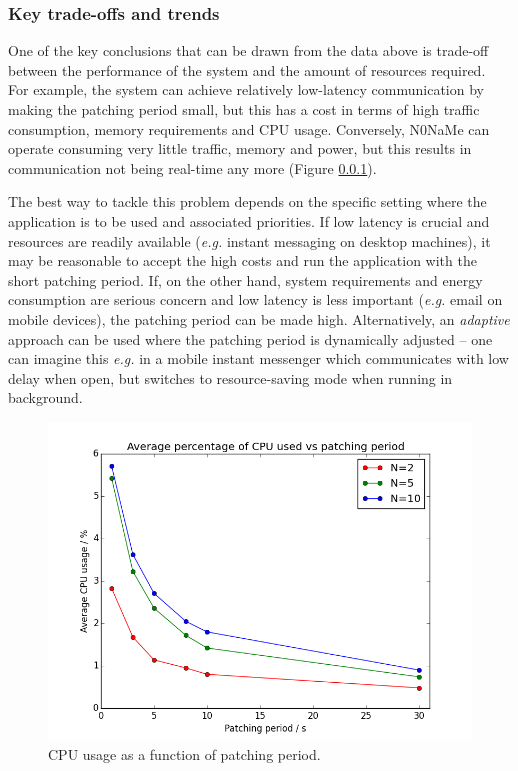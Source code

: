 \documentclass[a4paper, 12pt]{report}
\newcommand{\funkytt}{\fontfamily{AnonymousPro}\selectfont}
\begin{document}
\subsubsection{Key trade-offs and trends}
One of the key conclusions that can be drawn from the data above is trade-off between the performance of the system and the amount of resources required. \\

For example, the system can achieve relatively low-latency communication by making the patching period small, but this has a cost in terms of high traffic consumption, memory requirements and CPU usage. Conversely, {\funkytt N0NaMe} can operate consuming very little traffic, memory and power, but this results in communication not being real-time any more (Figure \ref{}). 


The best way to tackle this problem depends on the specific setting where the application is to be used and associated priorities. If low latency is crucial and resources are readily available (\textit{e.g.} instant messaging on desktop machines), it may be reasonable to accept the high costs and run the application with the short patching period. If, on the other hand, system requirements and energy consumption are serious concern and low latency is less important (\textit{e.g.} email on mobile devices), the patching period can be made high. Alternatively, an \emph{adaptive} approach can be used where the patching period is dynamically adjusted -- one can imagine this \emph{e.g.} in a mobile instant messenger which communicates with low delay when open, but switches to resource-saving mode when running in background.

\begin{figure}[H]
    \captionsetup{width=0.9\textwidth}
    \centering
    \includegraphics[width=0.78\linewidth]{pics/eval/cpu_vs_period.png}
    \caption{\label{fig:cpu_vs_period} CPU usage as a function of patching period.}
\end{figure}
\end{document}
